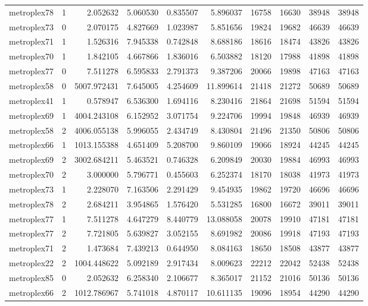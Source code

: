 \begin{longtable}{|l|r|r|r|r|r|r|r|r|r|}
metroplex78 & 1 & 2.052632 & 5.060530 & 0.835507 & 5.896037 & 16758 & 16630 & 38948 & 38948 \\
metroplex73 & 0 & 2.070175 & 4.827669 & 1.023987 & 5.851656 & 19824 & 19682 & 46639 & 46639 \\
metroplex71 & 1 & 1.526316 & 7.945338 & 0.742848 & 8.688186 & 18616 & 18474 & 43826 & 43826 \\
metroplex70 & 1 & 1.842105 & 4.667866 & 1.836016 & 6.503882 & 18120 & 17988 & 41898 & 41898 \\
metroplex77 & 0 & 7.511278 & 6.595833 & 2.791373 & 9.387206 & 20066 & 19898 & 47163 & 47163 \\
metroplex58 & 0 & 5007.972431 & 7.645005 & 4.254609 & 11.899614 & 21418 & 21272 & 50689 & 50689 \\
metroplex41 & 1 & 0.578947 & 6.536300 & 1.694116 & 8.230416 & 21864 & 21698 & 51594 & 51594 \\
metroplex69 & 1 & 4004.243108 & 6.152952 & 3.071754 & 9.224706 & 19994 & 19848 & 46939 & 46939 \\
metroplex58 & 2 & 4006.055138 & 5.996055 & 2.434749 & 8.430804 & 21496 & 21350 & 50806 & 50806 \\
metroplex66 & 1 & 1013.155388 & 4.651409 & 5.208700 & 9.860109 & 19066 & 18924 & 44245 & 44245 \\
metroplex69 & 2 & 3002.684211 & 5.463521 & 0.746328 & 6.209849 & 20030 & 19884 & 46993 & 46993 \\
metroplex70 & 2 & 3.000000 & 5.796771 & 0.455603 & 6.252374 & 18170 & 18038 & 41973 & 41973 \\
metroplex73 & 1 & 2.228070 & 7.163506 & 2.291429 & 9.454935 & 19862 & 19720 & 46696 & 46696 \\
metroplex78 & 2 & 2.684211 & 3.954865 & 1.576420 & 5.531285 & 16800 & 16672 & 39011 & 39011 \\
metroplex77 & 1 & 7.511278 & 4.647279 & 8.440779 & 13.088058 & 20078 & 19910 & 47181 & 47181 \\
metroplex77 & 2 & 7.721805 & 5.639827 & 3.052155 & 8.691982 & 20086 & 19918 & 47193 & 47193 \\
metroplex71 & 2 & 1.473684 & 7.439213 & 0.644950 & 8.084163 & 18650 & 18508 & 43877 & 43877 \\
metroplex22 & 2 & 1004.448622 & 5.092189 & 2.917434 & 8.009623 & 22212 & 22042 & 52438 & 52438 \\
metroplex85 & 0 & 2.052632 & 6.258340 & 2.106677 & 8.365017 & 21152 & 21016 & 50136 & 50136 \\
metroplex66 & 2 & 1012.786967 & 5.741018 & 4.870117 & 10.611135 & 19096 & 18954 & 44290 & 44290 \\

\end{longtable}
